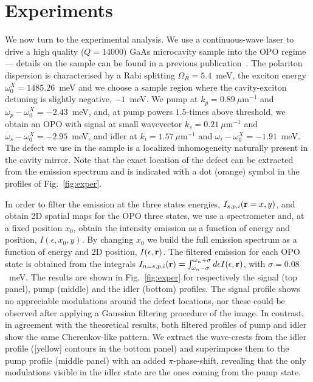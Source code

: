 \section{Experiments}
%
We now turn to the experimental analysis. We use a continuous-wave
laser to drive a high quality ($Q=14000$) GaAs microcavity sample into
the OPO regime --- details on the sample can be found in a previous
publication~\cite{Ballarini_2013,Dominici_2014}.
The polariton dispersion is characterised by a Rabi splitting
$\Omega_R=5.4$~meV, the exciton energy $\omega_0^{X}=1485.26$~meV and
we choose a sample region where the cavity-exciton detuning is
slightly negative, $-1$~meV. We pump at $k_p=0.89~\mu$m$^{-1}$ and
$\omega_p - \omega_0^{X}=-2.43$~meV, and, at pump powers $1.5$-times
above threshold, we obtain an OPO with signal at small wavevector
$k_s=0.21~\mu$m$^{-1}$ and $\omega_s - \omega_0^{X}=-2.95$~meV, and
idler at $k_i=1.57~\mu$m$^{-1}$ and $\omega_i -
\omega_0^{X}=-1.91$~meV.
%
The defect we use in the sample is a localized inhomogeneity naturally
present in the cavity mirror. Note that the exact location of the
defect can be extracted from the emission spectrum and is indicated
with a dot (orange) symbol in the profiles of Fig.~\ref{fig:exper}.

In order to filter the emission at the three states energies,
$I_{s,p,i}(\mathbf{r}=x,y)$, and obtain 2D spatial maps for the OPO
three states, we use a spectrometer and, at a fixed position $x_0$,
obtain the intensity emission as a function of energy and position,
$I(\epsilon,x_0,y)$. By changing $x_0$ we build the full emission
spectrum as a function of energy and 2D position,
$I(\epsilon,\mathbf{r})$. The filtered emission for each OPO state is
obtained from the integrals $I_{n=s,p,i}(\mathbf{r}) =
\int_{\omega_n-\sigma}^{\omega_n+\sigma} d\epsilon I(\epsilon,
\mathbf{r})$, with $\sigma=0.08$~meV. The results are shown in
Fig.~\ref{fig:exper} for respectively the signal (top panel), pump
(middle) and the idler (bottom) profiles.
%
The signal profile shows no appreciable modulations around the defect
locations, nor these could be observed after applying a Gaussian
filtering procedure of the image.
%
In contrast, in agreement with the theoretical results, both filtered
profiles of pump and idler show the same Cherenkov-like pattern. We
extract the wave-crests from the idler profile ([yellow] contours in
the bottom panel) and superimpose them to the pump profile (middle
panel) with an added $\pi$-phase-shift, revealing that the only
modulations visible in the idler state are the ones coming from the
pump state.


